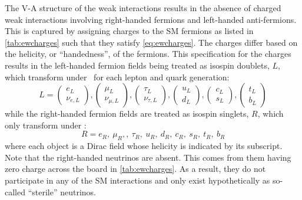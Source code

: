 The V-A structure of the weak interactions
results in the absence of charged weak interactions involving right-handed
fermions and left-handed anti-fermions.
This is captured
by assigning charges to the SM fermions 
as listed in \tab\ref{tab:ewcharges}
such that they satisfy \eqn\eqref{eq:ewcharges}.
The charges differ based on the helicity, or ``handedness'',
of the fermions.
This specification for the charges results in the 
left-handed fermion fields being treated as isospin doublets, $L$, 
which transform under \sutwo~for each lepton and quark generation:
\begin{equation}
L = 
\begin{pmatrix} e_L \\ \nu_{e,L} \end{pmatrix},
\begin{pmatrix} \mu_L \\ \nu_{\mu,L} \end{pmatrix},
\begin{pmatrix} \tau_L \\ \nu_{\tau,L} \end{pmatrix},
\begin{pmatrix} u_L \\ d_{L} \end{pmatrix},
\begin{pmatrix} c_L \\ s_{L} \end{pmatrix},
\begin{pmatrix} t_L \\ b_{L} \end{pmatrix}
\end{equation}
while the right-handed fermion fields are treated as isospin singlets, $R$, 
which only transform under \uone:
\begin{equation}
R = e_R,~\mu_R,,~\tau_R,~u_R,~d_R,~c_R,~s_R,~t_R,~b_R
\end{equation}
where each object is a Dirac field whose helicity is indicated by 
its subscript.
Note that the right-handed neutrinos are absent.
This comes from them having zero charge across 
the board in \tab\ref{tab:ewcharges}.
As a result, they do not participate in any of the SM interactions
and only exist hypothetically as so-called ``sterile'' neutrinos.

